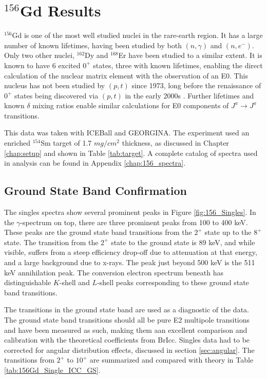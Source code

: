 \chapter{$^{156}$Gd Results}
\label{chap:156Gd}
\normalsize

$^{156}$Gd is one of the most well studied nuclei in the rare-earth region. It has a large number of known lifetimes, having been studied by both $(n,\gamma)$ and $(n,e^-)$\citep{klora93:_156gd}. Only two other nuclei, $^{162}$Dy and $^{168}$Er have been studied to a similar extent. It is known to have 6 excited $0^+$ states, three with known lifetimes, enabling the direct calculation of the nuclear matrix element with the observation of an E0. This nucleus has not been studied by $(p,t)$ since 1973, long before the renaissance of $0^+$ states being discovered via $(p,t)$ in the early 2000s \citep{fleming73:_156gd,lesher02:_158gd,meyer06:_zeroplus}. Further lifetimes and known $\delta$ mixing ratios enable similar calculations for E0 components of $J^{\pi}\rightarrow J^{\pi}$ transitions. 

This data was taken with ICEBall and GEORGINA. The experiment used an enriched $^{154}$Sm target of 1.7 $mg/cm^2$ thickness, as discussed in Chapter \ref{chap:setup} and shown in Table \ref{tab:target}. A complete catalog of spectra used in analysis can be found in Appendix \ref{chap:156_spectra}.

\section{Ground State Band Confirmation}

The singles spectra show several prominent peaks in Figure \ref{fig:156_Singles}. In the $\gamma$-spectrum on top, there are three prominent peaks from 100 to 400 keV. These peaks are the ground state band transitions from the $2^+$ state up to the $8^+$ state. The transition from the $2^+$ state to the ground state is 89 keV, and while visible, suffers from a steep efficiency drop-off due to attenuation at that energy, and a large background due to x-rays. The peak just beyond 500 keV is the 511 keV annihilation peak. The conversion electron spectrum beneath has distinguishable $K$-shell and $L$-shell peaks corresponding to these ground state band transitions. 

\afterpage{}

The transitions in the ground state band are used as a diagnostic of the data. The ground state band transitions should all be pure E2 multipole transitions and have been measured as such, making them aan excellent comparison and calibration with the theoretical coefficients from BrIcc\citep{kibedi08:_BRICC}. Singles data had to be corrected for angular distribution effects, discussed in section \ref{sec:angular}. The transitions from $2^+$ to $10^+$ are summarized and compared with theory in Table \ref{tab:156Gd_Single_ICC_GS}.

